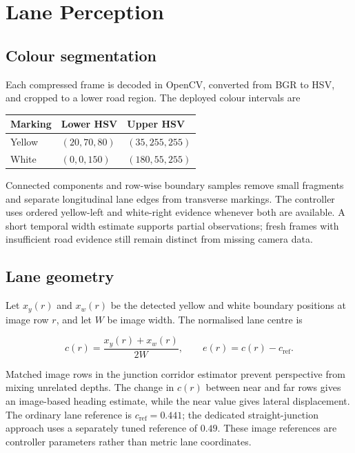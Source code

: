 \documentclass[10pt,a4paper,twocolumn]{article}
\begin{document}
\section{Lane Perception}

\subsection{Colour segmentation}

Each compressed frame is decoded in OpenCV, converted from BGR to HSV, and
cropped to a lower road region. The deployed colour intervals are

\begin{center}
\begin{tabular}{lll}
\toprule
Marking & Lower HSV & Upper HSV \\
\midrule
Yellow & $(20,70,80)$ & $(35,255,255)$ \\
White  & $(0,0,150)$ & $(180,55,255)$ \\
\bottomrule
\end{tabular}
\end{center}

Connected components and row-wise boundary samples remove small fragments and
separate longitudinal lane edges from transverse markings. The controller uses
ordered yellow-left and white-right evidence whenever both are available. A
short temporal width estimate supports partial observations; fresh frames with
insufficient road evidence still remain distinct from missing camera data.

\subsection{Lane geometry}

Let $x_y(r)$ and $x_w(r)$ be the detected yellow and white boundary positions at
image row $r$, and let $W$ be image width. The normalised lane centre is

\begin{equation}
 c(r)=\frac{x_y(r)+x_w(r)}{2W}, \qquad e(r)=c(r)-c_{\mathrm{ref}} .
\end{equation}

Matched image rows in the junction corridor estimator prevent perspective
from mixing unrelated depths.
The change in $c(r)$ between near and far rows gives an image-based heading
estimate, while the near value gives lateral displacement. The ordinary lane reference is $c_{\mathrm{ref}}=0.441$; the dedicated
straight-junction approach uses a separately tuned reference of $0.49$. These
image references are controller parameters rather than metric lane coordinates.
\end{document}
